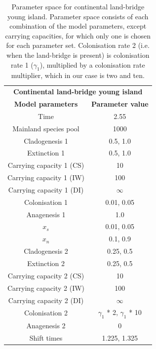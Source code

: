 \begin{table}[ht]
    \centering
    \caption{Parameter space for continental land-bridge young island. Parameter space consists of each combination of the model parameters, except carrying capacities, for which only one is chosen for each parameter set. Colonisation rate 2 (i.e. when the land-bridge is present) is colonisation rate 1 ($\gamma_1$), multiplied by a colonisation rate multiplier, which in our case is two and ten.}
    \begin{tabular}{ c | c }
        \multicolumn{2}{c}{\textbf{Continental land-bridge young island}} \\
        \textbf{Model parameters} & \textbf{Parameter value} \\ 
        \hline
        \hline
        Time & 2.55 \\
        \hline
        Mainland species pool & 1000 \\
        \hline
        Cladogenesis 1 & 0.5, 1.0 \\
        \hline
        Extinction 1 & 0.5, 1.0 \\
        \hline
        Carrying capacity 1 (CS) & 10 \\
        \hline
        Carrying capacity 1 (IW) & 100 \\
        \hline
        Carrying capacity 1 (DI) & $\infty$ \\
        \hline
        Colonisation 1 & 0.01, 0.05 \\
        \hline
        Anagenesis 1 & 1.0 \\
        \hline
        $x_s$ & 0.01, 0.05 \\
        \hline
        $x_n$ & 0.1, 0.9 \\
        \hline
        Cladogenesis 2 & 0.25, 0.5 \\
        \hline
        Extinction 2 & 0.25, 0.5 \\
        \hline
        Carrying capacity 2 (CS) & 10 \\
        \hline
        Carrying capacity 2 (IW) & 100 \\
        \hline
        Carrying capacity 2 (DI) & $\infty$ \\
        \hline
        Colonisation 2 & $\gamma_1$ * 2, $\gamma_1$ * 10 \\ 
        \hline 
        Anagenesis 2 & 0 \\
        \hline
        Shift times & 1.225, 1.325 \\
    \end{tabular}
    \label{tab:continental_lb_young}
\end{table}

